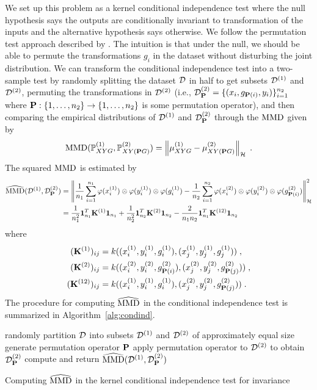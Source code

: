 We set up this problem as a kernel conditional independence test where the null hypothesis says the outputs are conditionally invariant to transformation of the inputs and the alternative hypothesis says otherwise. We follow the permutation test approach described by \textcite{Doran:2014}. The intuition is that under the null, we should be able to permute the transformations $g_i$ in the dataset without disturbing the joint distribution. We can transform the conditional independence test into a two-sample test by randomly splitting the dataset $\mathcal{D}$ in half to get subsets $\mathcal{D}^{(1)}$ and $\mathcal{D}^{(2)}$, permuting the transformations in $\mathcal{D}^{(2)}$ (i.e., $\mathcal{D}_{\mathbf{P}}^{(2)}=\{(x_i,g_{\mathbf{P}(i)},y_i)\}_{i=1}^{n_2}$ where $\mathbf{P}:\{1,\ldots,n_2\}\rightarrow\{1,\ldots,n_2\}$ is some permutation operator), and then comparing the empirical distributions of $\mathcal{D}^{(1)}$ and $\mathcal{D}_{\mathbf{P}}^{(2)}$ through the $\mathrm{MMD}$ given by
\[
\mathrm{MMD}(\mathbb{P}_{XYG}^{(1)},\mathbb{P}_{XY(\mathbf{P} G)}^{(2)}) = \left\|\mu_{XYG}^{(1)}-\mu_{XY(\mathbf{P} G)}^{(2)}\right\|_{\mathcal{H}} \;.
\]
The squared $\mathrm{MMD}$ is estimated by
\begin{align*}
\widehat{\mathrm{MMD}}(\mathcal{D}^{(1)},\mathcal{D}_{\mathbf{P}}^{(2)}) &= \left\|\frac{1}{n_1}\sum_{i=1}^{n_1}\varphi(x^{(1)}_i)\otimes\varphi(y^{(1)}_i)\otimes\varphi(g^{(1)}_i) - \frac{1}{n_2}\sum_{i=1}^{n_2}\varphi(x^{(2)}_i)\otimes\varphi(y^{(2)}_i)\otimes\varphi(g^{(2)}_{\mathbf{P}(i)})\right\|_{\mathcal{H}}^2 \\
&= \frac{1}{n_1^2}\mathbf{1}_{n_1}^T\mathbf{K}^{(1)}\mathbf{1}_{n_1} + \frac{1}{n_2^2}\mathbf{1}_{n_2}^T\mathbf{K}^{(2)}\mathbf{1}_{n_2} - \frac{2}{n_1n_2}\mathbf{1}_{n_1}^T\mathbf{K}^{(12)}\mathbf{1}_{n_2}
\end{align*}
where
\begin{align*}
(\mathbf{K}^{(1)})_{ij} &= k((x^{(1)}_i,y^{(1)}_i,g^{(1)}_i),(x^{(1)}_j,y^{(1)}_j,g^{(1)}_j)) \;, \\
(\mathbf{K}^{(2)})_{ij} &= k((x^{(2)}_i,y^{(2)}_i,g^{(2)}_{\mathbf{P}(i)}),(x^{(2)}_j,y^{(2)}_j,g^{(2)}_{\mathbf{P}(j)})) \;, \\
(\mathbf{K}^{(12)})_{ij} &= k((x^{(1)}_i,y^{(1)}_i,g^{(1)}_i),(x^{(2)}_j,y^{(2)}_j,g^{(2)}_{\mathbf{P}(j)})) \;.
\end{align*}
The procedure for computing $\widehat{\mathrm{MMD}}$ in the conditional independence test is summarized in Algorithm~\ref{alg:condind}.
\\

\begin{algorithm}[H]
\SetAlgoLined
{}
\BlankLine
randomly partition $\mathcal{D}$ into subsets $\mathcal{D}^{(1)}$ and $\mathcal{D}^{(2)}$ of approximately equal size\;
generate permutation operator $\mathbf{P}$\;
apply permutation operator to $\mathcal{D}^{(2)}$ to obtain $\mathcal{D}_{\mathbf{P}}^{(2)}$\;
compute and return $\widehat{\mathrm{MMD}}(\mathcal{D}^{(1)},\mathcal{D}_{\mathbf{P}}^{(2)})$\;
\caption{Computing $\widehat{\mathrm{MMD}}$ in the kernel conditional independence test for invariance}
\label{alg:condind}
\end{algorithm}
\vspace{1em}

